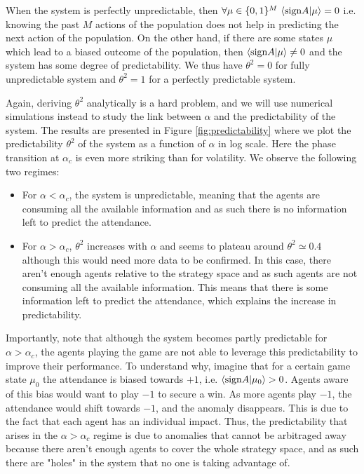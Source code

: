 \documentclass[a4paper, amsfonts, amssymb, amsmath, reprint, showkeys, nofootinbib, twoside]{revtex4-1}
\begin{document}
When the system is perfectly unpredictable, then $\forall \mu\in \{ 0,1\}^M \ \langle \textnormal{sign}A|\mu \rangle = 0$ i.e. knowing the past $M$ actions of the population does not help in predicting the next action of the population. On the other hand, if there are some states $\mu$ which lead to a biased outcome of the population, then $\langle \textnormal{sign}A|\mu \rangle \neq 0$ and the system has some degree of predictability. We thus have $\theta^2=0$ for fully unpredictable system and $\theta^2=1$ for a perfectly predictable system.

Again, deriving $\theta^2$ analytically is a hard problem, and we will use numerical simulations instead to study the link between $\alpha$ and the predictability of the system. The results are presented in Figure \ref{fig:predictability} where we plot the predictability $\theta^2$ of the system as a function of $\alpha$ in log scale. Here the phase transition at $\alpha_c$ is even more striking than for volatility. We observe the following two regimes:
\begin{itemize}
    \item For $\alpha < \alpha_c$, the system is unpredictable, meaning that the agents are consuming all the available information and as such there is no information left to predict the attendance.
    \item For $\alpha > \alpha_c$, $\theta^2$ increases with $\alpha$ and seems to plateau around $\theta^2 \simeq 0.4$ although this would need more data to be confirmed. In this case, there aren't enough agents relative to the strategy space and as such agents are not consuming all the available information. This means that there is some information left to predict the attendance, which explains the increase in predictability.
\end{itemize}
Importantly, note that although the system becomes partly predictable for $\alpha > \alpha_c$, the agents playing the game are not able to leverage this predictability to improve their performance. To understand why, imagine that for a certain game state $\mu_0$ the attendance is biased towards $+1$, i.e. $\langle \textnormal{sign}A|\mu_0 \rangle > 0$. Agents aware of this bias would want to play $-1$ to secure a win. As more agents play $-1$, the attendance would shift towards $-1$, and the anomaly disappears. This is due to the fact that each agent has an individual impact. Thus, the predictability that arises in the $\alpha > \alpha_c$ regime is due to anomalies that cannot be arbitraged away because there aren't enough agents to cover the whole strategy space, and as such there are "holes" in the system that no one is taking advantage of.
\end{document}
